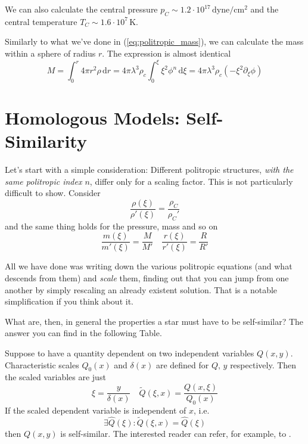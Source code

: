 \par We can also calculate the central pressure $p_{C}\sim 1.2\cdot 10^{17}\,\text{dyne}/\text{cm}^{2}$ and the central temperature $T_{C}\sim 1.6\cdot 10^{7}\,\text{K}$.
\par Similarly to what we've done in (\ref{eq:politropic_mass}), we can calculate the mass within a sphere of radius $r$. The expression is almost identical
\begin{equation}
    M = \int_{0}^{r} 4\pi r^{2}\rho\,\text{d}r = 4\pi \lambda^{3}\rho_{c}\int_{0}^{\xi}\xi^{2}\phi^{n}\,\text{d}\xi = 4\pi \lambda^{3}\rho_{c}(-\xi^{2}\partial_{\xi}\phi)
\end{equation} 

\section{Homologous Models: Self-Similarity}

\par Let's start with a simple consideration: Different politropic structures, \emph{with the same politropic index $n$}, differ only for a scaling factor. This is not particularly difficult to show. Consider
\begin{equation*}
	\frac{\rho(\xi)}{\rho'(\xi)} = \frac{\rho_{C}}{\rho_{C}'}
\end{equation*}
and the same thing holds for the pressure, mass and so on
\begin{equation*}
	\frac{m(\xi)}{m'(\xi)} = \frac{M}{M'} \quad \frac{r(\xi)}{r'(\xi)} = \frac{R}{R'}
\end{equation*}
\par All we have done was writing down the various politropic equations (and what descends from them) and \emph{scale} them, finding out that you can jump from one another by simply rescaling an already existent solution. That is a notable simplification if you think about it.
\par What are, then, in general the properties a star must have to be self-similar? The answer you can find in the following Table.
\begin{tcolorbox}[enhanced,attach boxed title to top center={yshift=-3mm,yshifttext=-1mm},
colback=blue!5!white,colframe=blue!75!black,colbacktitle=blue!80!black,
title=Self-Similarity,
boxed title style={size=small,colframe=blue!50!black}]
Suppose to have a quantity dependent on two independent variables $Q(x,y)$. Characteristic scales $Q_{0}(x)$ and $\delta(x)$ are defined for $Q,\,y$ respectively. Then the scaled variables are just 
	\begin{equation*}
		\xi = \frac{y}{\delta(x)} \quad \tilde{Q}(\xi, x)=\frac{Q(x,\xi)}{Q_{0}(x)}
	\end{equation*}
	If the scaled dependent variable is independent of $x$, i.e.
	\begin{equation*}
		\exists\hat{Q}(\xi): \tilde{Q}(\xi, x) = \hat{Q}(\xi)
	\end{equation*}
	then $Q(x,y)$ is self-similar. The interested reader can refer, for example, to \cite{Pope_2000}.
\end{tcolorbox}

